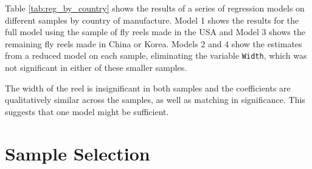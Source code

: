 \documentclass[11pt]{paper}
\begin{document}
Table \ref{tab:reg_by_country} shows the results of 
a series of regression models 
on different samples by country of manufacture.
Model 1 shows the results 
for the full model
using the sample of fly reels made in the USA
and Model 3 shows the remaining fly reels made in China or Korea.
Models 2 and 4 show the estimates from a reduced model
on each sample, eliminating the variable \texttt{Width}, 
which was not significant in either of these smaller samples.



The width of the reel is insignificant in both samples
and the coefficients are qualitatively similar across the samples, as well as matching in significance. 
This suggests that one model might be sufficient. 

%
%
%



\clearpage
\section{Sample Selection}
\end{document}
